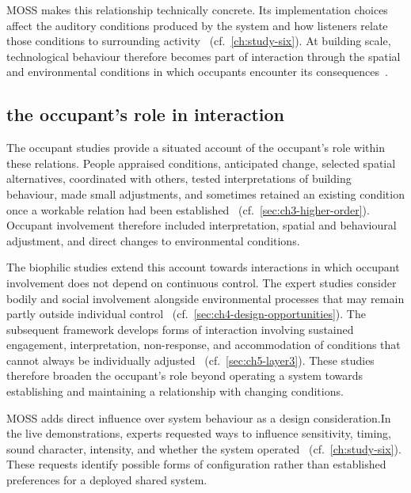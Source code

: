 MOSS makes this relationship technically concrete. Its implementation choices affect the auditory conditions produced by the system and how listeners relate those conditions to surrounding activity~\cite{rao2027biophilic} (cf.~\autoref{ch:study-six}). At building scale, technological behaviour therefore becomes part of interaction through the spatial and environmental conditions in which occupants encounter its consequences~\cite{alavi2018artifacts,nguyen2022responsive}.



\subsection{the occupant's role in interaction}
\label{subsec:occupant-participation-interaction}
The occupant studies provide a situated account of the occupant's role within these relations. People appraised conditions, anticipated change, selected spatial alternatives, coordinated with others, tested interpretations of building behaviour, made small adjustments, and sometimes retained an existing condition once a workable relation had been established~\cite{rao2026emotion} (cf.~\autoref{sec:ch3-higher-order}). Occupant involvement therefore included interpretation, spatial and behavioural adjustment, and direct changes to environmental conditions.

The biophilic studies extend this account towards interactions in which occupant involvement does not depend on continuous control. The expert studies consider bodily and social involvement alongside environmental processes that may remain partly outside individual control~\cite{rao2025designing} (cf.~\autoref{sec:ch4-design-opportunities}). The subsequent framework develops forms of interaction involving sustained engagement, interpretation, non-response, and accommodation of conditions that cannot always be individually adjusted~\cite{rao2026biophilic} (cf.~\autoref{sec:ch5-layer3}). These studies therefore broaden the occupant's role beyond operating a system towards establishing and maintaining a relationship with changing conditions.

MOSS adds direct influence over system behaviour as a design consideration.In the live demonstrations, experts requested ways to influence sensitivity, timing, sound character, intensity, and whether the system operated~\cite{rao2027biophilic} (cf.~\autoref{ch:study-six}). These requests identify possible forms of configuration rather than established preferences for a deployed shared system.

